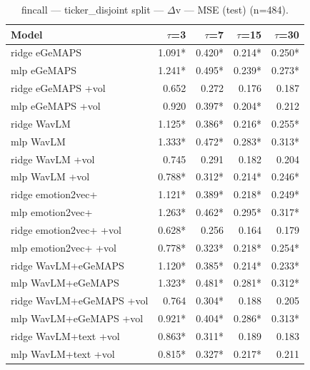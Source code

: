 \begin{table}[t]
\centering
\begin{tabular}{lrrrr}
\toprule
Model & $\tau$=3 & $\tau$=7 & $\tau$=15 & $\tau$=30 \\
\midrule
ridge eGeMAPS & 1.091* & 0.420* & 0.214* & 0.250* \\
mlp eGeMAPS & 1.241* & 0.495* & 0.239* & 0.273* \\
ridge eGeMAPS +vol & 0.652 & 0.272 & 0.176 & 0.187 \\
mlp eGeMAPS +vol & 0.920 & 0.397* & 0.204* & 0.212 \\
ridge WavLM & 1.125* & 0.386* & 0.216* & 0.255* \\
mlp WavLM & 1.333* & 0.472* & 0.283* & 0.313* \\
ridge WavLM +vol & 0.745 & 0.291 & 0.182 & 0.204 \\
mlp WavLM +vol & 0.788* & 0.312* & 0.214* & 0.246* \\
ridge emotion2vec+ & 1.121* & 0.389* & 0.218* & 0.249* \\
mlp emotion2vec+ & 1.263* & 0.462* & 0.295* & 0.317* \\
ridge emotion2vec+ +vol & 0.628* & 0.256 & 0.164 & 0.179 \\
mlp emotion2vec+ +vol & 0.778* & 0.323* & 0.218* & 0.254* \\
ridge WavLM+eGeMAPS & 1.120* & 0.385* & 0.214* & 0.233* \\
mlp WavLM+eGeMAPS & 1.323* & 0.481* & 0.281* & 0.312* \\
ridge WavLM+eGeMAPS +vol & 0.764 & 0.304* & 0.188 & 0.205 \\
mlp WavLM+eGeMAPS +vol & 0.921* & 0.404* & 0.286* & 0.313* \\
ridge WavLM+text +vol & 0.863* & 0.311* & 0.189 & 0.183 \\
mlp WavLM+text +vol & 0.815* & 0.327* & 0.217* & 0.211 \\
\bottomrule
\end{tabular}
\caption{fincall — ticker\_disjoint split — $\Delta$v — MSE (test) (n=484).}
\end{table}
